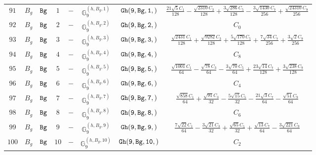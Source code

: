 \documentclass[fleqn,8pt]{jsarticle}
\begin{document}
\begin{table}[ht!]
\begin{center}
\begin{tabular}{cccccccc}
$ 91 $ & $ B_{g} $ & $ {\tt Bg} $ & $ 1 $ & $ - $ & $ \mathbb{G}_{9}^{(h,B_{g},1)} $ & $ {\tt Gh(9,Bg,1,)} $ & $ \frac{21 \sqrt{5} C_{1}}{128} - \frac{\sqrt{2310} C_{3}}{128} + \frac{3 \sqrt{286} C_{5}}{128} - \frac{3 \sqrt{1430} C_{7}}{256} + \frac{\sqrt{24310} C_{9}}{256} $ \\
$ 92 $ & $ B_{g} $ & $ {\tt Bg} $ & $ 2 $ & $ - $ & $ \mathbb{G}_{9}^{(h,B_{g},2)} $ & $ {\tt Gh(9,Bg,2,)} $ & $ C_{0} $ \\
$ 93 $ & $ B_{g} $ & $ {\tt Bg} $ & $ 3 $ & $ - $ & $ \mathbb{G}_{9}^{(h,B_{g},3)} $ & $ {\tt Gh(9,Bg,3,)} $ & $ \frac{\sqrt{2431} C_{1}}{128} + \frac{\sqrt{9282} C_{3}}{128} + \frac{5 \sqrt{170} C_{5}}{128} + \frac{7 \sqrt{34} C_{7}}{256} + \frac{3 \sqrt{2} C_{9}}{256} $ \\
$ 94 $ & $ B_{g} $ & $ {\tt Bg} $ & $ 4 $ & $ - $ & $ \mathbb{G}_{9}^{(h,B_{g},4)} $ & $ {\tt Gh(9,Bg,4,)} $ & $ C_{8} $ \\
$ 95 $ & $ B_{g} $ & $ {\tt Bg} $ & $ 5 $ & $ - $ & $ \mathbb{G}_{9}^{(h,B_{g},5)} $ & $ {\tt Gh(9,Bg,5,)} $ & $ \frac{\sqrt{1001} C_{1}}{64} - \frac{\sqrt{78} C_{3}}{64} - \frac{3 \sqrt{70} C_{5}}{64} + \frac{23 \sqrt{14} C_{7}}{128} + \frac{3 \sqrt{238} C_{9}}{128} $ \\
$ 96 $ & $ B_{g} $ & $ {\tt Bg} $ & $ 6 $ & $ - $ & $ \mathbb{G}_{9}^{(h,B_{g},6)} $ & $ {\tt Gh(9,Bg,6,)} $ & $ C_{4} $ \\
$ 97 $ & $ B_{g} $ & $ {\tt Bg} $ & $ 7 $ & $ - $ & $ \mathbb{G}_{9}^{(h,B_{g},7)} $ & $ {\tt Gh(9,Bg,7,)} $ & $ \frac{\sqrt{858} C_{1}}{64} + \frac{\sqrt{91} C_{3}}{32} - \frac{5 \sqrt{15} C_{5}}{32} - \frac{21 \sqrt{3} C_{7}}{64} - \frac{\sqrt{51} C_{9}}{64} $ \\
$ 98 $ & $ B_{g} $ & $ {\tt Bg} $ & $ 8 $ & $ - $ & $ \mathbb{G}_{9}^{(h,B_{g},8)} $ & $ {\tt Gh(9,Bg,8,)} $ & $ C_{6} $ \\
$ 99 $ & $ B_{g} $ & $ {\tt Bg} $ & $ 9 $ & $ - $ & $ \mathbb{G}_{9}^{(h,B_{g},9)} $ & $ {\tt Gh(9,Bg,9,)} $ & $ \frac{7 \sqrt{22} C_{1}}{64} - \frac{3 \sqrt{21} C_{3}}{32} + \frac{\sqrt{65} C_{5}}{32} + \frac{\sqrt{13} C_{7}}{64} - \frac{3 \sqrt{221} C_{9}}{64} $ \\
$ 100 $ & $ B_{g} $ & $ {\tt Bg} $ & $ 10 $ & $ - $ & $ \mathbb{G}_{9}^{(h,B_{g},10)} $ & $ {\tt Gh(9,Bg,10,)} $ & $ C_{2} $ \\
 \hline \hline
\end{tabular}
\end{center}
\end{table}
\end{document}
